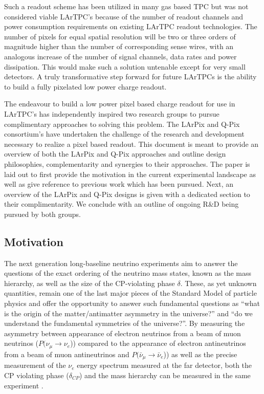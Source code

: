 \documentclass[reprint,amsmath,amssymb,aps,prl,superscriptaddress]{revtex4-1}
\begin{document}
Such a readout scheme has been utilized in many gas based TPC but was not considered viable LArTPC's because of the number of readout channels and power consumption requirements on existing LArTPC readout technologies. The number of pixels for equal spatial resolution will be two or three orders of magnitude higher than the number of corresponding sense wires, with an analogous increase of the number of signal channels, data rates and power dissipation. This would make such a solution untenable except for very small detectors. A truly transformative step forward for future LArTPCs is the ability to build a fully pixelated low power charge readout.

The endeavour to build a low power pixel based charge readout for use in LArTPC's has independently inspired two research groups to pursue complimentary approaches to solving this problem. The LArPix \cite{} and Q-Pix \cite{} consortium's have undertaken the challenge of the research and development necessary to realize a pixel based readout. This document is meant to provide an overview of both the LArPix and Q-Pix approaches and outline design philosophies, complementarity and synergies to their approaches. The paper is laid out to first provide the motivation in the current experimental landscape as well as give reference to previous work which has been pursued. Next, an overview of the LArPix and Q-Pix designs is given with a dedicated section to their complimentarity. We conclude with an outline of ongoing R\&D being pursued by both groups.    

\subsection{Motivation}\label{sec:motive}
The next generation long-baseline neutrino experiments aim to answer the questions of the exact ordering of the neutrino mass states, known as the mass hierarchy, as well as the size of the CP-violating phase $\delta$. These, as yet unknown quantities, remain one of the last major pieces of the Standard Model of particle physics and offer the opportunity to answer such fundamental questions as ``what is the origin of the matter/antimatter asymmetry in the universe?'' and ``do we understand the fundamental symmetries of the universe?''. By measuring the asymmetry between appearance of electron neutrinos from a beam of muon neutrinos ($P(\nu_{\mu} \rightarrow \nu_{e}$)) compared to the appearance of electron antineutrinos from a beam of muon antineutrinos and $P(\bar{\nu}_{\mu} \rightarrow \bar{\nu}_{e}$)) as well as the precise measurement of the $\nu_{e}$ energy spectrum measured at the far detector, both the CP violating phase ($\delta_{CP}$) and the mass hierarchy can be measured in the same experiment .
\end{document}
